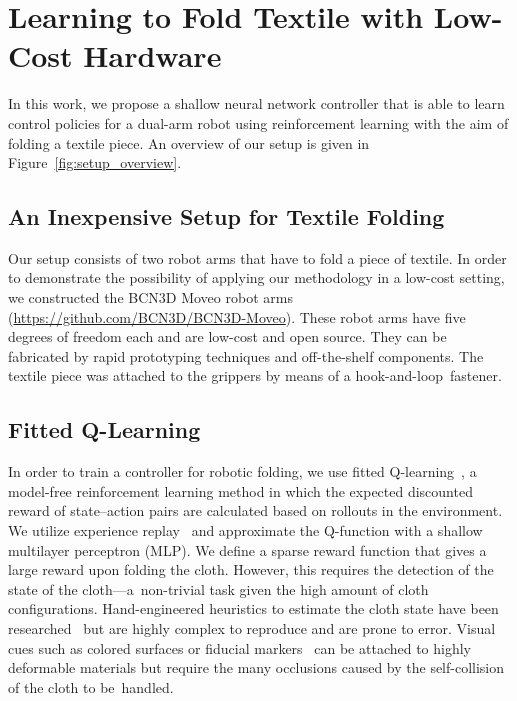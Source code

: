 \documentclass[applsci,article,accept,moreauthors,pdftex]{Definitions/mdpi}
\begin{document}
\section{Learning to Fold Textile with Low-Cost Hardware}
\label{sec:setup}
In this work, we propose a shallow neural network controller that is able to learn control policies for a dual-arm robot using reinforcement learning with the aim of folding a textile piece. An overview of our setup is given in Figure~\ref{fig:setup_overview}.

\subsection{An Inexpensive Setup for Textile Folding}
\label{subsec:robots}
Our setup consists of two robot arms that have to fold a piece of textile. In order to demonstrate the possibility of applying our methodology in a low-cost setting, we constructed the BCN3D Moveo robot arms (\url{https://github.com/BCN3D/BCN3D-Moveo}). These robot arms have five degrees of freedom each and are low-cost and open source. They can be fabricated by rapid prototyping techniques and off-the-shelf components. The textile piece was attached to the grippers by means of a hook-and-loop~fastener.

\subsection{Fitted Q-Learning}
\label{subsec:rl}

In order to train a controller for robotic folding, we use fitted Q-learning~\cite{Watkins1992}, a model-free reinforcement learning method in which the expected discounted reward of state--action pairs are calculated based on rollouts in the environment. We utilize experience replay~\cite{Lin1992} and approximate the Q-function with a shallow multilayer perceptron (MLP). We define a sparse reward function that gives a large reward upon folding the cloth. However, this requires the detection of the state of the cloth---a~non-trivial task given the high amount of cloth configurations. Hand-engineered heuristics to estimate the cloth state have been researched~\cite{Doumanoglou2016} but are highly complex to reproduce and are prone to error. Visual cues such as colored surfaces or fiducial markers~\cite{Bersch2011, Tsurumine2019} can be attached to highly deformable materials but require the many occlusions caused by the self-collision of the cloth to be~handled.
\end{document}
